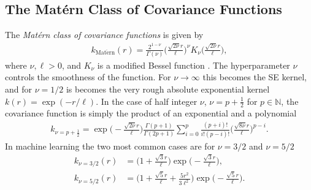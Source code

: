 \documentclass[twoside,english]{uiofysmaster}
\begin{document}
{%

\subsection{The Mat\'{e}rn Class of Covariance Functions}\label{Sec:: gaussian process : Matern Class of Covariance Functions}

The \textit{Mat\'{e}rn class of covariance functions} is given by
\begin{align}\label{Eq:: gaussian process : Matern class of covariance functions}
k_{\mathrm{Mat\acute{e}rn}} (r) = \frac{2^{1- \nu}}{\Gamma (\nu)} \Big( \frac{\sqrt{2 \nu} r	}{\ell} \Big)^{\nu} K_{\nu} \Big( \frac{\sqrt{2 \nu}r}{\ell} \Big),
\end{align}
where $\nu, \ell > 0$, and $K_{\nu}$ is a modified Bessel function \cite{abramowitz1964handbook}. The hyperparameter $\nu$ controls the smoothness of the function. For $\nu \rightarrow \infty$ this becomes the SE kernel, and for $\nu = 1/2$ is becomes the very rough absolute exponential kernel $k(r) = \exp (-r/\ell)$. In the case of half integer $\nu$, $\nu = p + \frac{1}{2}$ for $p \in \mathbb{N}$, the covariance function is simply the product of an exponential and a polynomial
\begin{align}
k_{\nu=p+\frac{1}{2}} = \exp \Big(- \frac{\sqrt{2 \nu} r	}{\ell} \Big) \frac{\Gamma(p+1)}{\Gamma(2p + 1)} \sum^p_{i=0} \frac{(p+i)!}{i!(p-i)!} \Big( \frac{\sqrt{8 \nu} r	}{\ell} \Big)^{p-i}.
\end{align}
In machine learning the two most common cases are for $\nu = 3/2$ and $\nu = 5/2$
\begin{align}
k_{\nu = 3/2}(r) &=  \Big(1 + \frac{\sqrt{3}r}{\ell} \Big) \exp \Big( -\frac{\sqrt{3}r}{\ell} \Big),\\
k_{\nu = 5/2}(r) &=  \Big(1 + \frac{\sqrt{5}r}{\ell}  + \frac{5r^2}{3 \ell^2}\Big) \exp \Big( -\frac{\sqrt{5}r}{\ell} \Big).
\end{align}



}
\end{document}
